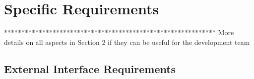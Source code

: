 %
%
\chapter{Specific Requirements}
%
\label{cap:specificrequirements}
%
%
************************************************************* More details on all aspects in Section 2 if they can be useful for the development team
%
\section{External Interface Requirements}
